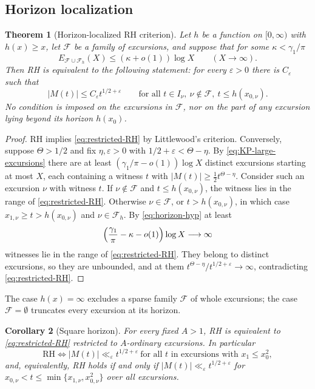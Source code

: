 \documentclass[11pt]{amsart}
\numberwithin{equation}{section}
\theoremstyle{plain}
\newtheorem{theorem}{Theorem}[section]
\newtheorem{corollary}[theorem]{Corollary}
\theoremstyle{definition}
\theoremstyle{remark}
\newcommand{\eps}{\varepsilon}
\newcommand{\F}{\mathcal{F}}
\begin{document}
\subsection{Horizon localization}
\label{subsec:horizon}

\begin{theorem}[Horizon-localized RH criterion]
\label{thm:horizon}
\label{thm:sparse-RH}
Let $h$ be a function on $[0,\infty)$ with $h(x)\ge x$, let $\F$ be a family
of excursions, and suppose that for some $\kappa<\gamma_1/\pi$
\begin{equation}
\label{eq:horizon-hyp}
E_{\F\cup\F_h}(X)\le(\kappa+o(1))\log X\qquad(X\to\infty).
\end{equation}
Then RH is equivalent to the following statement: for every $\eps>0$ there
is $C_\eps$ such that
\begin{equation}
\label{eq:restricted-RH}
|M(t)|\le C_\eps t^{1/2+\eps}
\qquad\text{for all }t\in I_\nu,\ \nu\notin\F,\ t\le h(x_{0,\nu}).
\end{equation}
No condition is imposed on the excursions in $\F$, nor on the part of any
excursion lying beyond its horizon $h(x_0)$.
\end{theorem}

\begin{proof}
RH implies \eqref{eq:restricted-RH} by Littlewood's criterion. Conversely,
suppose $\Theta>1/2$ and fix $\eta,\eps>0$ with
$1/2+\eps<\Theta-\eta$. By \eqref{eq:KP-large-excursions} there are at least
$(\gamma_1/\pi-o(1))\log X$ distinct excursions starting at most $X$, each
containing a witness $t$ with $|M(t)|\ge\frac12t^{\Theta-\eta}$. Consider
such an excursion $\nu$ with witness $t$. If $\nu\notin\F$ and
$t\le h(x_{0,\nu})$, the witness lies in the range of
\eqref{eq:restricted-RH}. Otherwise $\nu\in\F$, or $t>h(x_{0,\nu})$, in
which case $x_{1,\nu}\ge t>h(x_{0,\nu})$ and $\nu\in\F_h$. By
\eqref{eq:horizon-hyp} at least
\[
\Bigl(\frac{\gamma_1}{\pi}-\kappa-o(1)\Bigr)\log X\longrightarrow\infty
\]
witnesses lie in the range of \eqref{eq:restricted-RH}. They belong to
distinct excursions, so they are unbounded, and at them
$t^{\Theta-\eta}/t^{1/2+\eps}\to\infty$, contradicting
\eqref{eq:restricted-RH}.
\end{proof}

The case $h(x)=\infty$ excludes a sparse family $\F$ of whole excursions;
the case $\F=\emptyset$ truncates every excursion at its horizon.

\begin{corollary}[Square horizon]
\label{cor:power-ordinary-RH}
\label{cor:square-truncated-RH}
For every fixed $A>1$, RH is equivalent to \eqref{eq:restricted-RH}
restricted to $A$-ordinary excursions. In particular
\begin{equation}
\label{eq:square-horizon-RH}
\boxed{\ \mathrm{RH}\iff
|M(t)|\ll_\eps t^{1/2+\eps}
\ \text{for all $t$ in excursions with }x_1\le x_0^2,\ }
\end{equation}
and, equivalently, RH holds if and only if
$|M(t)|\ll_\eps t^{1/2+\eps}$ for $x_{0,\nu}<t\le\min\{x_{1,\nu},x_{0,\nu}^2\}$
over all excursions.
\end{corollary}
\end{document}
